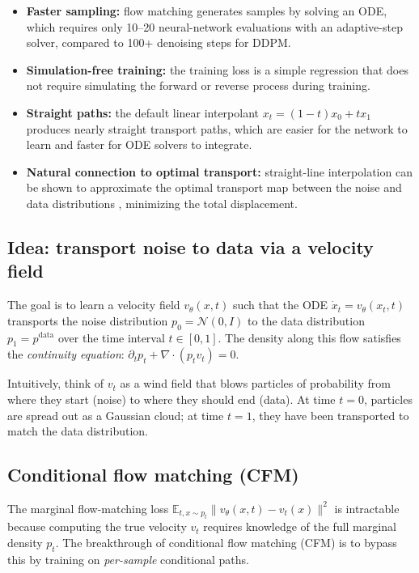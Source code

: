 \documentclass[11pt,letterpaper]{article}
\theoremstyle{plain}
\theoremstyle{definition}
\theoremstyle{remark}
\newcommand{\E}{\mathbb{E}}
\newcommand{\calN}{\mathcal{N}}
\newcommand{\divg}{\nabla\cdot}
\newcommand{\norm}[1]{\lVert #1\rVert}
\begin{document}
\begin{itemize}[nosep]
  \item \textbf{Faster sampling:} flow matching generates samples by
    solving an ODE, which requires only 10--20 neural-network
    evaluations with an adaptive-step solver, compared to 100+ denoising
    steps for DDPM.
  \item \textbf{Simulation-free training:} the training loss is a simple
    regression that does not require simulating the forward or reverse
    process during training.
  \item \textbf{Straight paths:} the default linear interpolant
    $x_t=(1-t)x_0+tx_1$ produces nearly straight transport paths, which
    are easier for the network to learn and faster for ODE solvers to
    integrate.
  \item \textbf{Natural connection to optimal transport:}
    straight-line interpolation can be shown to approximate the optimal
    transport map between the noise and data distributions
    \citep{tong2023ot}, minimizing the total displacement.
\end{itemize}

\subsection{Idea: transport noise to data via a velocity field}

The goal is to learn a velocity field $v_\theta(x,t)$ such that the
ODE $\dot x_t=v_\theta(x_t,t)$ transports the noise distribution
$p_0=\calN(0,I)$ to the data distribution $p_1=p^{\mathrm{data}}$
over the time interval $t\in[0,1]$.  The density along this flow
satisfies the \emph{continuity equation}:
$\partial_tp_t+\divg(p_tv_t)=0$.

Intuitively, think of $v_t$ as a wind field that blows particles of
probability from where they start (noise) to where they should end
(data).  At time $t=0$, particles are spread out as a Gaussian cloud;
at time $t=1$, they have been transported to match the data
distribution.

\subsection{Conditional flow matching (CFM)}

The marginal flow-matching loss
$\E_{t,x\sim p_t}\norm{v_\theta(x,t)-v_t(x)}^2$ is intractable
because computing the true velocity $v_t$ requires knowledge of the
full marginal density $p_t$.  The breakthrough of conditional flow
matching (CFM) is to bypass this by training on \emph{per-sample}
conditional paths.
\end{document}
